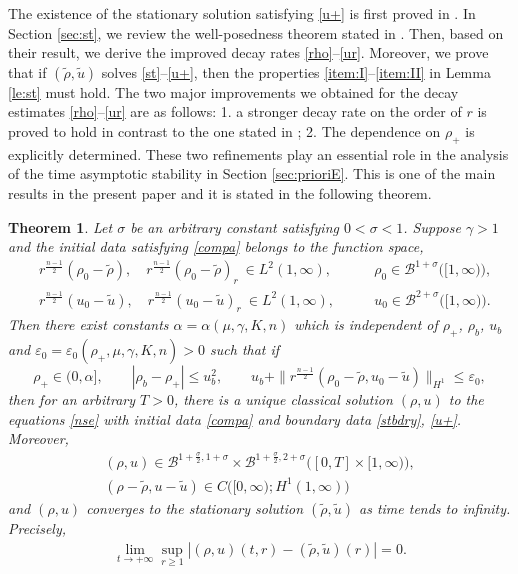 \documentclass[a4paper,12pt,draft]{article}
\newtheorem{theorem}{Theorem}[section]
\theoremstyle{remark}
\def\ut{\tilde{u}}
\def\rt{\tilde{\rho}}
\def\ep{\varepsilon}
\begin{document}
The existence of the stationary solution satisfying \eqref{u+} is first proved in \cite{h-m21}.
In Section \ref{sec:st}, we review the well-posedness theorem stated in \cite{h-m21}. Then, based on their result, we derive the improved decay rates \eqref{rho}--\eqref{ur}. Moreover, we prove that if $(\rt,\ut)$ solves \eqref{st}--\eqref{u+}, then the properties \ref{item:I}--\ref{item:II} in Lemma \ref{le:st} must hold. The two major improvements we obtained for the decay estimates \eqref{rho}--\eqref{ur} are as follows: 1. a stronger decay rate on the order of $r$ is proved to hold in contrast to the one stated in \cite{h-m21}; 2. The dependence on $\rho_{+}$ is explicitly determined. These two refinements play an essential role in the analysis of the time asymptotic stability in Section \ref{sec:prioriE}. This is one of the main results in the present paper and it is stated in the following theorem. 
\begin{theorem}
\label{mth}
Let $\sigma$ be an arbitrary constant
satisfying $0<\sigma<1$.
Suppose $\gamma>1$ and the initial data satisfying \eqref{compa} belongs to the function space,
\begin{subequations}\label{IDReg}
\begin{align}
 &r^{\frac{n-1}{2}}(\rho_0-\rt), \quad r^{\frac{n-1}{2}} (\rho_0-\rt)_r \ \in L^2(1,\infty), \qquad & \rho_0 \in \mathcal{B}^{1+\sigma}\big([1,\infty)\big), \\ 
 & r^{\frac{n-1}{2}} (u_0-\ut), \quad r^{\frac{n-1}{2}} (u_0-\ut)_r \ \in L^2(1,\infty), \qquad & u_0\in \mathcal{B}^{2+\sigma}\big([1,\infty)\big).
\end{align}
\end{subequations}
Then there exist constants $ \alpha= \alpha(\mu,\gamma,K,n)$ which is independent of $\rho_+$, $\rho_b$, $u_b$ and $\ep_0=\ep_0(\rho_+,\mu,\gamma,K,n)>0$ such that if
\begin{equation*}
    \rho_{+}\in (0,\alpha], \qquad  |\rho_b-\rho_+|\le u_b^2, \qquad u_b +\|r^{\frac{n-1}{2}}(\rho_0-\rt,u_0-\ut)\|_{H^1} \le \ep_0,
\end{equation*}
then for an arbitrary $T > 0$, there is a unique classical solution $(\rho, u)$ to the equations \eqref{nse} with initial data \eqref{compa} and boundary data \eqref{stbdry}, \eqref{u+}. Moreover,
\begin{gather*}
\nonumber
(\rho, u)\in \mathcal{B}^{1+\frac{\sigma}{2},1+\sigma}\times \mathcal{B}^{1+\frac{\sigma}{2},2+\sigma}\big([0,T]\times [1,\infty)\big),\\
(\rho-\rt, u-\ut)\in C\big([0, \infty); H^1(1,\infty)\big)
\end{gather*}
and $(\rho, u)$ converges to the stationary solution $(\rt,\ut)$ as time tends to infinity. Precisely,
\begin{align}\label{Tasymp}
\lim_{t\to +\infty}\sup_{r \ge 1}|(\rho, u)(t,r)-(\rt,\ut)(r)|=0.
\end{align}
\end{theorem}
\end{document}
